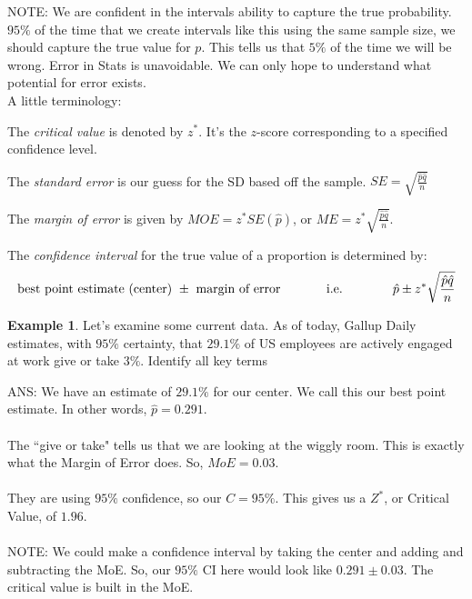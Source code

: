\documentclass[12pt]{amsart}
\theoremstyle{definition}
\newtheorem{ex}{Example}
\begin{document}
 \noindent NOTE: We are confident in the intervals ability to capture the true probability. $95\%$ of the time that we create intervals like this using the same sample size, we should capture the true value for $p$. This tells us that $5\%$ of the time we will be wrong. Error in Stats is unavoidable. We can only hope to understand what potential for error exists.\\

 A little terminology:
 \begin{framed}
 	The \emph{critical value} is denoted by $z^*$. It's the $z$-score corresponding to a specified confidence level.
 	
 	The \emph{standard error} is our guess for the SD based off the sample. $SE=\sqrt{\frac{\hat{p}\hat{q}}{n}}$
 	
 	The \emph{margin of error} is given by $MOE=z^*SE(\hat{p})$, or $ME=z^*\sqrt{\frac{\hat{p}\hat{q}}{n}}$.
 	
 	The \emph{confidence interval} for the true value of a proportion is determined by:
 	\[
 	\textrm{best point estimate (center)}\ \pm\ \textrm{margin of error} \hspace{0.5in} \textrm{i.e.}\ \hspace{0.5in} \hat{p}\pm z^*\sqrt{\frac{\hat{p}\hat{q}}{n}}
 	\]	
 \end{framed}
 
 \begin{ex} Let's examine some current data. As of today, Gallup Daily estimates, with $95\%$ certainty, that $29.1\%$ of US employees are actively engaged at work give or take $3\%$. Identify all key terms\end{ex}
 
 ANS: We have an estimate of $29.1\%$ for our center. We call this our best point estimate. In other words, $\hat{p}=0.291$.\\
 ~\\
 The ``give or take" tells us that we are looking at the wiggly room. This is exactly what the Margin of Error does. So, $MoE=0.03$.\\
 ~\\
 They are using $95\%$ confidence, so our $C=95\%$. This gives us a $Z^*$, or Critical Value, of $1.96$.\\
 ~\\
 NOTE: We could make a confidence interval by taking the center and adding and subtracting the MoE. So, our $95\%$ CI here would look like $0.291\pm 0.03$. The critical value is built in the MoE.
 
\end{document}
